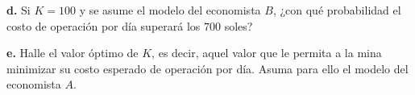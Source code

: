 \documentclass{article}
\newenvironment{statement}[1]{\smallskip\noindent\color[rgb]{1.00,0.00,0.50} {\bf #1.}}{}
\theoremstyle{definition}
\theoremstyle{remark}
\begin{document}
\begin{statement}{d}
  Si $K = 100$ y se asume el modelo del economista $B$, ¿con qu\'e probabilidad
  el costo de operaci\'on por d\'ia superar\'a los $700$ soles?
\end{statement}

\begin{statement}{e}
  Halle el valor \'optimo de $K$, es decir, aquel valor que le permita a la mina
  minimizar su costo esperado de operaci\'on por d\'ia.
  Asuma para ello el modelo del economista $A$.
\end{statement}
\end{document}

